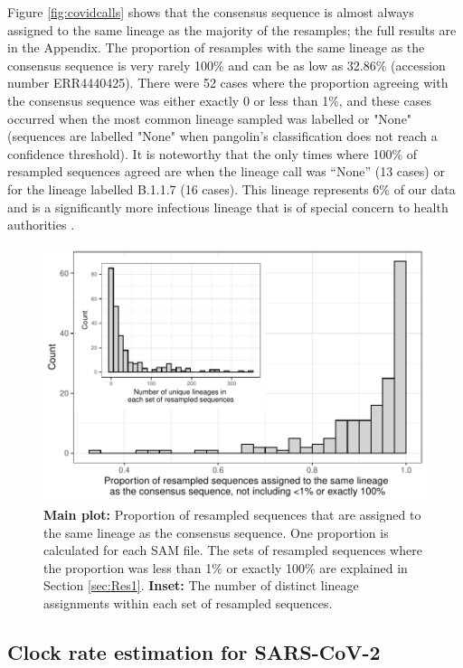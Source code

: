 \documentclass[12pt]{article}
\begin{document}
Figure \ref{fig:covidcalls} shows that the consensus sequence is almost always assigned to the same lineage as the majority of the resamples; the full results are in the Appendix.
The proportion of resamples with the same lineage as the consensus sequence is very rarely 100\% and can be as low as 32.86\% (accession number ERR4440425).
There were 52 cases where the proportion agreeing with the consensus sequence was either exactly 0 or less than 1\%, and these cases occurred when the most common lineage sampled was labelled or "None" (sequences are labelled "None" when pangolin's classification does not reach a confidence threshold).
It is noteworthy that the only times where 100\% of resampled sequences agreed are when the lineage call was ``None'' (13 cases) or for the lineage labelled B.1.1.7 (16 cases).
This lineage represents 6\% of our data and is a significantly more infectious lineage that is of special concern to health authorities \citep{Wisem4857, europeancentrefordiseasepreventionandcontrolSARSCoV2VariantsConcern2021}. 


\begin{figure}
\centering
\includegraphics[width=0.8\linewidth]{figs/prop_correct.pdf}
\caption{\label{fig:covidcalls2}\textbf{Main {}plot:} Proportion of resampled sequences that are assigned to the same lineage as the consensus sequence.
One proportion is calculated for each SAM file.
The sets of resampled sequences where the proportion was less than 1\% or exactly 100\% are explained in Section \ref{sec:Res1}.
\textbf{Inset:} The number of distinct lineage assignments within each set of resampled sequences.}
\end{figure}



\subsection{Clock rate estimation for SARS-CoV-2}
\end{document}
